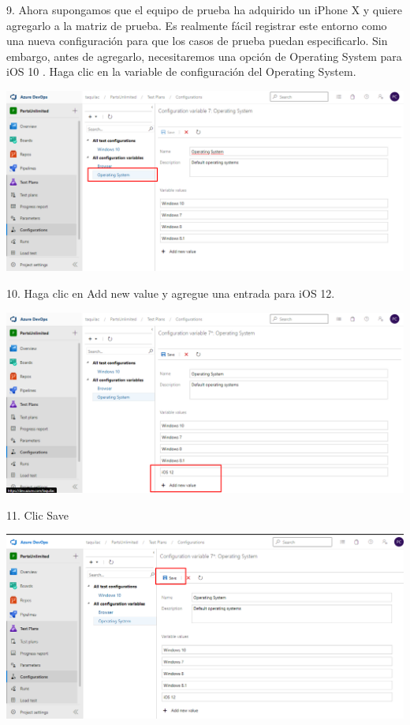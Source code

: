 \documentclass[12pt,letterpaper]{article}
\begin{document}
9. Ahora supongamos que el equipo de prueba ha adquirido un iPhone X y quiere agregarlo a la matriz de prueba. Es realmente fácil registrar este entorno como una nueva configuración para que los casos de prueba puedan especificarlo. Sin embargo, antes de agregarlo, necesitaremos una opción de Operating System para iOS 10 . Haga clic en la variable de configuración del Operating System.

\begin{center}
		\includegraphics[width=15cm]{./Imagenes/20} 
\end{center}

10. Haga clic en Add new value y agregue una entrada para iOS 12.

\begin{center}
		\includegraphics[width=15cm]{./Imagenes/21} 
\end{center}

11. Clic Save

\begin{center}
		\includegraphics[width=15cm]{./Imagenes/22} 
\end{center}
\end{document}

